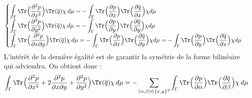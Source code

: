 \begin{equation} \displaystyle
    \begin{cases}
    \displaystyle \int_{\Gamma} \Tr \Bigr(\frac{\partial^2 p}{\partial x^2}\Bigl) \Tr(\overline{q}) \chi \hspace{2pt} d\mu = - \int_{\Gamma} \Tr \Bigl( \frac{\partial p}{\partial x} \Bigr) \Tr \Bigl( \frac{\partial \overline{q}}{\partial x}\Bigr)\chi d\mu \\

    \displaystyle \int_{\Gamma} \Tr \Bigr(\frac{\partial^2 p}{\partial y^2}\Bigl) \Tr(\overline{q})\chi \hspace{2pt} d\mu = - \int_{\Gamma} \Tr \Bigl( \frac{\partial p}{\partial y} \Bigr) \Tr \Bigl( \frac{\partial \overline{q}}{\partial y}\Bigr)\chi d\mu \\

    \displaystyle \int_{\Gamma} \Tr \Bigr(\frac{\partial^2 p}{\partial x \partial y}\Bigl) \Tr(\overline{q}) \chi \hspace{2pt} d\mu = - \int_{\Gamma} \Tr \Bigl( \frac{\partial p}{\partial x} \Bigr) \Tr \Bigl( \frac{\partial \overline{q}}{\partial y}\Bigr) \chi d\mu = - \int_{\Gamma} \Tr \Bigl( \frac{\partial p}{\partial y} \Bigr) \Tr \Bigl( \frac{\partial \overline{q}}{\partial x}\Bigr)\chi d\mu
    \end{cases}
\end{equation}
L'intérêt de la dernière égalité est de garantir la symétrie de la forme bilinéaire qui adviendra. On obtient donc : 
\begin{equation}
    \int_{\Gamma} \Tr \Bigr(\frac{\partial^2 p}{\partial x^2}+2\frac{\partial^2 p}{\partial x \partial y} + \frac{\partial^2 p}{\partial y^2} \Bigl) \Tr(\overline{q})\chi \hspace{2pt} d\mu = -\sum_{(\alpha,\beta)\in \{x,y\}^2} \int_{\Gamma} \Tr \Bigl( \frac{\partial p}{\partial \alpha} \Bigr) \Tr \Bigl( \frac{\partial \overline{q}}{\partial \beta}\Bigr)\chi \hspace{2pt} d\mu
\end{equation}
